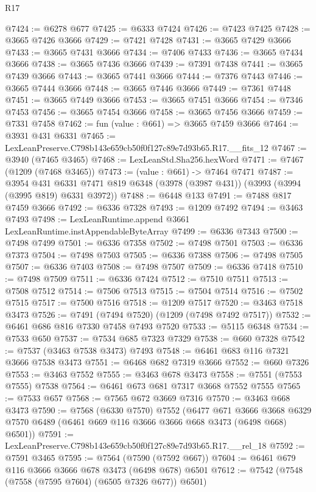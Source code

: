 \begin{lexlean}{R17}
\begin{coremodule}
@7424 := @6278 @677
@7425 := @6333 @7424
@7426 := @7423 @7425
@7428 := @3665 @7426 @3666
@7429 := @7421 @7428
@7431 := @3665 @7429 @3666
@7433 := @3665 @7431 @3666
@7434 := @7406 @7433
@7436 := @3665 @7434 @3666
@7438 := @3665 @7436 @3666
@7439 := @7391 @7438
@7441 := @3665 @7439 @3666
@7443 := @3665 @7441 @3666
@7444 := @7376 @7443
@7446 := @3665 @7444 @3666
@7448 := @3665 @7446 @3666
@7449 := @7361 @7448
@7451 := @3665 @7449 @3666
@7453 := @3665 @7451 @3666
@7454 := @7346 @7453
@7456 := @3665 @7454 @3666
@7458 := @3665 @7456 @3666
@7459 := @7331 @7458
@7462 := fun (value : @661) => @3665 @7459 @3666
@7464 := @3931 @431 @6331
@7465 := LexLeanPreserve.C798b143e659cb50f0f127c89e7d93b65.R17.__fits_12
@7467 := @3940 (@7465 @3465)
@7468 := LexLeanStd.Sha256.hexWord
@7471 := @7467 (@1209 (@7468 @3465))
@7473 := (value : @661) -> @7464 @7471
@7487 := @3954
    @431
    @6331
    @7471
    @819
    @6348
    (@3978 (@3987 @431))
    (@3993 (@3994 (@3995 @819) @6331 @3972))
@7488 := @6448 @133
@7491 := @7488 @817 @7459 @3666
@7492 := @6336 @7328
@7493 := @1209 @7492
@7494 := @3463 @7493
@7498 := LexLeanRuntime.append @3661 LexLeanRuntime.instAppendableByteArray
@7499 := @6336 @7343
@7500 := @7498 @7499
@7501 := @6336 @7358
@7502 := @7498 @7501
@7503 := @6336 @7373
@7504 := @7498 @7503
@7505 := @6336 @7388
@7506 := @7498 @7505
@7507 := @6336 @7403
@7508 := @7498 @7507
@7509 := @6336 @7418
@7510 := @7498 @7509
@7511 := @6336 @7424
@7512 := @7510 @7511
@7513 := @7508 @7512
@7514 := @7506 @7513
@7515 := @7504 @7514
@7516 := @7502 @7515
@7517 := @7500 @7516
@7518 := @1209 @7517
@7520 := @3463 @7518 @3473
@7526 := @7491 (@7494 @7520) (@1209 (@7498 @7492 @7517))
@7532 := @6461 @686 @816 @7330 @7458 @7493 @7520
@7533 := @5115 @6348
@7534 := @7533 @650
@7537 := @7534 @685 @7323 @7329
@7538 := @660 @7328
@7542 := @7537 (@3463 @7538 @3473) @7493
@7548 := @6461 @683 @116 @7321 @3666 @7538 @3473
@7551 := @6468 @682 @7319 @3666
@7552 := @660 @7326
@7553 := @3463 @7552
@7555 := @3463 @678 @3473
@7558 := @7551 (@7553 @7555) @7538
@7564 := @6461 @673 @681 @7317 @3668 @7552 @7555
@7565 := @7533 @657
@7568 := @7565 @672 @3669 @7316
@7570 := @3463 @668 @3473
@7590 := @7568
    (@6330 @7570)
    @7552
    (@6477
      @671
      @3666
      @3668
      @6329
      @7570
      @6489
      (@6461 @669 @116 @3666 @3666 @668 @3473 (@6498 @668) @6501))
@7591 := LexLeanPreserve.C798b143e659cb50f0f127c89e7d93b65.R17.__rel_18
@7592 := @7591 @3465
@7595 := @7564 (@7590 (@7592 @667))
@7604 := @6461 @679 @116 @3666 @3666 @678 @3473 (@6498 @678) @6501
@7612 := @7542 (@7548 (@7558 (@7595 @7604) (@6505 @7326 @677)) @6501)

\end{coremodule}
\end{lexlean}
